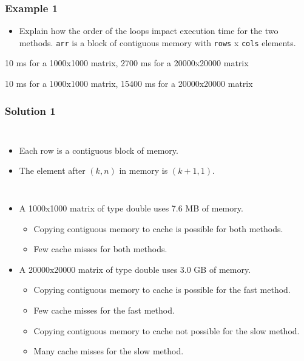 \documentclass{beamer}
\begin{document}
\begin{frame}
  \frametitle{Example 1}
  \begin{itemize}
  \item Explain how the order of the loops impact execution time for the two methods. \texttt{arr} is a block of contiguous memory with \texttt{rows} x \texttt{cols} elements.
  \end{itemize}
  \begin{block}{10 ms for a 1000x1000 matrix, 2700 ms for a 20000x20000 matrix}
    \tiny\texttt{}
  \end{block}
  \begin{block}{10 ms for a 1000x1000 matrix, 15400 ms for a 20000x20000 matrix}
    \tiny\texttt{}
  \end{block}
\end{frame}

\begin{frame}
  \frametitle{Solution 1}
  
  \begin{columns}[c]
    \begin{itemize}
    \item Each row is a contiguous block of memory.
    \item The element after $(k,n)$ in memory is $(k+1,1)$.
    \end{itemize}
    \begin{figure}
      \noindent\makebox[\textwidth]{\scalebox{0.7}{}}
    \end{figure}
  \end{columns}
  \begin{itemize}
  \item A 1000x1000 matrix of type double uses 7.6 MB of memory.
    \begin{itemize}
    \item Copying contiguous memory to cache is possible for both methods.
    \item Few cache misses for both methods.
    \end{itemize}
  \item A 20000x20000 matrix of type double uses 3.0 GB of memory.
    \begin{itemize}
    \item Copying contiguous memory to cache is possible for the fast method.
    \item Few cache misses for the fast method.
    \item Copying contiguous memory to cache not possible for the slow method.
    \item Many cache misses for the slow method.
    \end{itemize}
  \end{itemize}
\end{frame}
\end{document}

